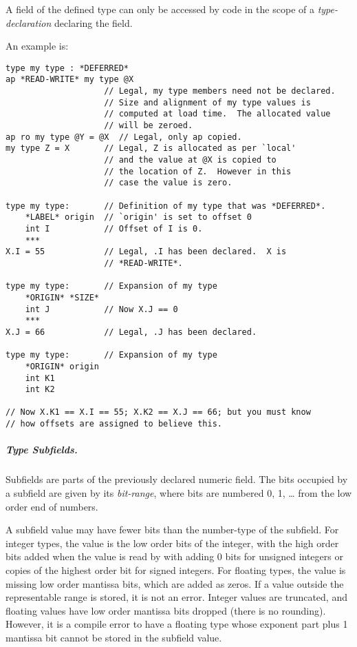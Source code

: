 \documentclass[12pt]{article}
\newcommand{\subsubsubsubsection}[1]{\subparagraph[#1]{#1.}}
\newenvironment{indpar}[1][0.3in]%
	{\begin{list}{}%
		     {\setlength{\itemsep}{0in}%
		      \setlength{\topsep}{0in}%
		      \setlength{\parsep}{1ex}%
		      \setlength{\labelwidth}{#1}%
		      \setlength{\leftmargin}{#1}%
		      \addtolength{\leftmargin}{\labelsep}}%
	 \item}%
	{\end{list}}
\begin{document}
A field of
the defined type can only be accessed by code in the scope
of a {\em type-declaration} declaring the field.

An example is:

\begin{indpar}\begin{verbatim}
type my type : *DEFERRED*
ap *READ-WRITE* my type @X
                    // Legal, my type members need not be declared.
                    // Size and alignment of my type values is
                    // computed at load time.  The allocated value
                    // will be zeroed.
ap ro my type @Y = @X  // Legal, only ap copied.
my type Z = X       // Legal, Z is allocated as per `local'
                    // and the value at @X is copied to
                    // the location of Z.  However in this
                    // case the value is zero.

type my type:       // Definition of my type that was *DEFERRED*.
    *LABEL* origin  // `origin' is set to offset 0
    int I           // Offset of I is 0.
    ***
X.I = 55            // Legal, .I has been declared.  X is
                    // *READ-WRITE*.

type my type:       // Expansion of my type
    *ORIGIN* *SIZE*
    int J           // Now X.J == 0
    ***
X.J = 66            // Legal, .J has been declared.

type my type:       // Expansion of my type
    *ORIGIN* origin
    int K1
    int K2

// Now X.K1 == X.I == 55; X.K2 == X.J == 66; but you must know
// how offsets are assigned to believe this.
\end{verbatim}\end{indpar}

\subsubsubsubsection{Type Subfields}

Subfields are parts of the previously declared numeric field.
The bits occupied
by a subfield are given by its {\em bit-range}, where bits are numbered
0, 1, \ldots{} from the low order end of numbers.

A subfield value may have fewer bits than the number-type of the subfield.
For integer types, the value is the low order bits of the integer, with
the high order bits added when the value is read by with adding 0 bits
for unsigned integers or copies of the highest order bit for signed integers.
For floating types, the value is missing low order mantissa bits, which
are added as zeros.  If a value outside the representable range is stored,
it is not an error.  Integer values are truncated, and floating values
have low order mantissa bits dropped (there is no rounding).  However, it is
a compile error to have a floating type whose exponent part plus
1 mantissa bit cannot be stored in the subfield value.
\end{document}
